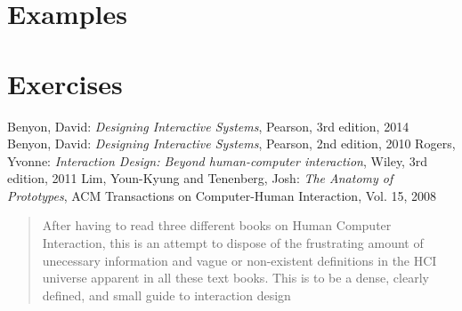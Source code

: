 \documentclass[a4, english, twoside]{article}
\begin{document}
\section{Examples}
\label{sec:2}



\newpage
\section{Exercises}
\label{sec:3}




\newpage
\begin{minipage}{1.0\textwidth}
  \begin{thebibliography}{9}
    Benyon, David: \emph{Designing Interactive Systems}, Pearson, 3rd edition, 2014
    Benyon, David: \emph{Designing Interactive Systems}, Pearson, 2nd edition, 2010
    Rogers, Yvonne: \emph{Interaction Design: Beyond human-computer interaction}, Wiley, 3rd edition, 2011
    Lim, Youn-Kyung and Tenenberg, Josh: \emph{The Anatomy of Prototypes}, ACM Transactions on Computer-Human Interaction, Vol. 15, 2008
  \end{thebibliography}
  
  
\end{minipage}

\newpage
\printindex

\newpage
\thispagestyle{empty} %
\begin{center}
  \begin{minipage}[r]{0.6\linewidth}
    \phantom{}\vspace{2.7cm}
    \begin{abstract}
      \noindent After having to read three different books on Human Computer Interaction, this is an attempt to dispose of the frustrating amount of unecessary information and vague or non-existent definitions in the HCI universe apparent in all these text books. This is to be a dense, clearly defined, and small guide to interaction design
    \end{abstract}  
  \end{minipage}  
\end{center}

\BgThispage
\end{document}
